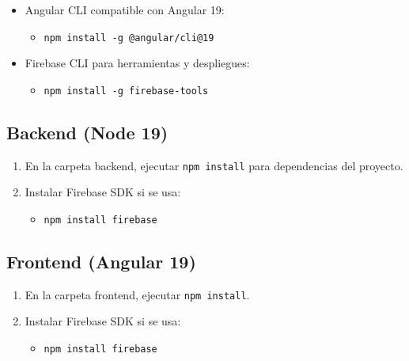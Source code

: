 \documentclass[
  spanish,
  11pt,
]{report}
\providecommand{\tightlist}{%
  \setlength{\itemsep}{0pt}\setlength{\parskip}{0pt}}
\begin{document}
\begin{itemize}
\tightlist
\item
  Angular CLI compatible con Angular 19:

  \begin{itemize}
  \tightlist
  \item
    \texttt{npm\ install\ -g\ @angular/cli@19}
  \end{itemize}
\item
  Firebase CLI para herramientas y despliegues:

  \begin{itemize}
  \tightlist
  \item
    \texttt{npm\ install\ -g\ firebase-tools}
  \end{itemize}
\end{itemize}

\subsection{Backend (Node 19)}\label{backend-node-19}

\begin{enumerate}
\def\labelenumi{\arabic{enumi}.}
\tightlist
\item
  En la carpeta backend, ejecutar \texttt{npm\ install} para
  dependencias del proyecto.
\item
  Instalar Firebase SDK si se usa:

  \begin{itemize}
  \tightlist
  \item
    \texttt{npm\ install\ firebase}
  \end{itemize}
\end{enumerate}

\subsection{Frontend (Angular 19)}\label{frontend-angular-19-1}

\begin{enumerate}
\def\labelenumi{\arabic{enumi}.}
\tightlist
\item
  En la carpeta frontend, ejecutar \texttt{npm\ install}.
\item
  Instalar Firebase SDK si se usa:

  \begin{itemize}
  \tightlist
  \item
    \texttt{npm\ install\ firebase}
  \end{itemize}
\end{enumerate}
\end{document}
